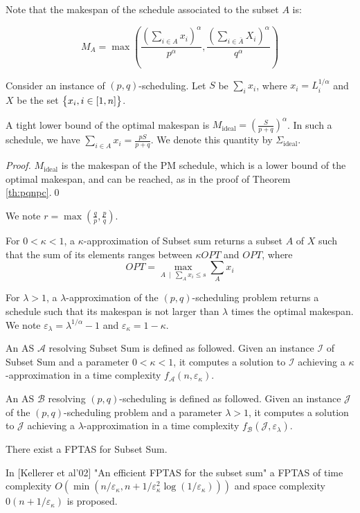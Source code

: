 \documentclass{llncs}
\newcommand{\A}{\ensuremath{\mathcal A}\xspace}
\newcommand{\B}{\ensuremath{\mathcal B}\xspace}
\newcommand{\mideal}{\ensuremath{{M}_{\mathrm{ideal}}}\xspace}
\newcommand{\saideal}{\ensuremath{{\Sigma}_{\mathrm{ideal}}}\xspace}
\newcommand{\sa}{\ensuremath{\sum_{i\in A} x_i}}
\newcommand{\saalp}{\ensuremath{\left(\sum_{i\in A} x_i\right)^\alpha}}
\newcommand{\sabalp}{\ensuremath{\left(\sum_{i\in \bar A} X_i\right)^\alpha}}
\newcommand{\puisa}[1]{\left(#1\right)^\alpha}
\newcommand{\ek}{\varepsilon_{\kappa}}
\newcommand{\el}{\varepsilon_\lambda}
\begin{document}
Note that the makespan of the schedule associated to the subset $A$ is:

$$M_A=\max\left(\frac{\saalp}{p^\alpha}, \frac{\sabalp}{q^\alpha}\right)$$



Consider an instance of $(p,q)$-scheduling. Let $S$ be $\sum_i x_i$, where $x_i=L_i^{1/\alpha}$ and $X$ be the set $\left\{x_i, i\in[1,n]\strut\right\}$.


\begin{lemma}
A tight lower bound of the optimal makespan is $ \mideal = \puisa{\frac{S}{p+q}}$. In such a schedule, we have $\sa = \frac{pS}{p+q}$. We denote this quantity by $\saideal$.
\end{lemma}

\begin{proof}
$\mideal$ is the makespan of the PM schedule, which is a lower bound of the optimal makespan, and can be reached, as in the proof of Theorem \ref{th:pqnpc}.\qed
\end{proof}

We note $r =\max\left(\frac qp,\frac pq\right)$.


For $0<\kappa<1$, a $\kappa$-approximation of {\sc Subset sum} returns a subset $A$ of $X$ such that the sum of its elements ranges between $\kappa OPT$ and $OPT$, where $$\displaystyle OPT = \max\limits_{A\  \mid\  \sum_A x_i \leq s} \sum_{A} x_i$$

For $\lambda>1$, a $\lambda$-approximation of the $(p,q)$-scheduling problem returns a schedule such that its makespan is not larger than $\lambda$ times the optimal makespan.
We note $\varepsilon_\lambda=\lambda^{1/\alpha}-1$ and $\varepsilon_\kappa = 1-\kappa$.

An AS \A resolving {\sc Subset Sum} is defined as followed. Given an instance $\mathcal I$ of {\sc Subset Sum} and a parameter $0<\kappa<1$, it computes a solution to $\mathcal I$ achieving a $\kappa$-approximation in a time complexity $f_\A(n,\ek)$. 

An AS \B resolving $(p,q)$-scheduling is defined as followed. Given an instance $\mathcal J$ of the $(p,q)$-scheduling problem and a parameter $\lambda>1$, it computes a solution to $\mathcal J$ achieving a $\lambda$-approximation in a time complexity $f_\B(\mathcal J,\el)$.

\newcommand{\mtgamrap}{\max\left(3,\left\lceil\frac{1}{\ek}-4\right\rceil\right)}

\begin{remark}
There exist a FPTAS for {\sc Subset Sum}.



In [Kellerer et al'02] "An efficient FPTAS for the subset sum" a FPTAS of time complexity $O\left(\min\left(n/\ek,n+1/\ek^2\log(1/\ek)\right)\right)$ and space complexity $0(n+1/\ek)$ is proposed.

\end{remark}
\end{document}
